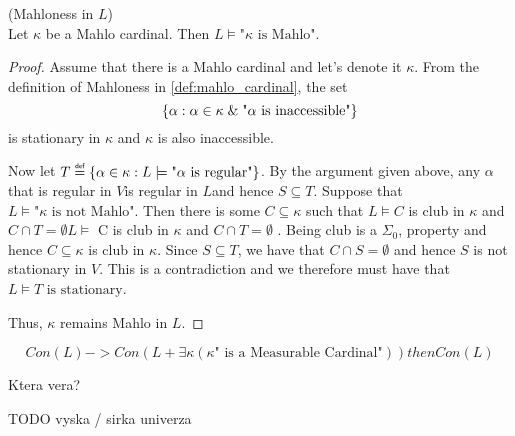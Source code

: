 \begin{theorem}{(Mahloness in $L$)}\label{theorem:mahlo_in_l}\\
Let $\kappa$ be a Mahlo cardinal. Then $L \models \mbox{"$\kappa$ is Mahlo"}$.
\end{theorem}

\begin{proof}
Assume that there is a Mahlo cardinal and let's denote it $\kappa$. From the definition of Mahloness in \ref{def:mahlo_cardinal}, the set 
\begin{equation}
\{\alpha : \alpha \in \kappa \mathrel{\&} \mbox{"$\alpha$ is inaccessible"}\}
\end{equation}
is stationary in $\kappa$ and $\kappa$ is also inaccessible.

Now let $T\defeq \{\alpha \in \kappa : L\models\mbox{"$\alpha$ is regular"}\}$. By the argument given above, any $\alpha$ that is regular in $V$is regular in $L$and hence $S\subseteq T$. Suppose that $L \models \mbox{"$\kappa$ is not Mahlo"}$. Then there is some $C\subseteq \kappa$ such that $L\models C$ is club in $\kappa$ and $C\cap T=\emptyset L\models$ C is club in $\kappa$ and $C\cap T=\emptyset$ . Being club is a $\Sigma_0$, property and hence $C\subseteq \kappa$ is club in $\kappa$. Since $S \subseteq T$, we have that $C\cap S=\emptyset$ and hence $S$ is not stationary in $V$. This is a contradiction and we therefore must have that $L \models \mbox{$T$ is stationary}$.

Thus, $\kappa$ remains Mahlo in $L$.


\end{proof}


\begin{theorem}
\begin{equation}
Con(L) -> Con(L + \exists \kappa (\kappa \mbox{" is a Measurable Cardinal"})) then Con(L)
\end{equation}
\end{theorem}
Ktera vera?

TODO vyska / sirka univerza

